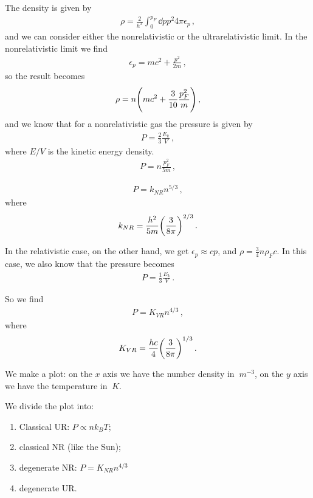 \documentclass[main.tex]{subfiles}
\begin{document}
The density is given by 
%
\begin{align}
  \rho = \frac{2}{h^3} \int_{0}^{p_F} \dd{p} p^2 4 \pi \epsilon _p
\,,
\end{align}
%
and we can consider either the nonrelativistic or the ultrarelativistic limit. In the nonrelativistic limit we find 
%
\begin{align}
  \epsilon _p = mc^2 + \frac{p^2}{2m}
\,,
\end{align}
%
so the result becomes 
%
\begin{align}
  \rho = n \qty(mc^2 + \frac{3}{10} \frac{p_F^2}{m})
\,,
\end{align}
%
and we know that for a nonrelativistic gas the pressure is given by 
%
\begin{align}
  P  = \frac{2}{3} \frac{E_k}{V}
\,,
\end{align}
%
where \(E/V\) is the kinetic energy density. 
%
\begin{align}
  P = n \frac{p_F^2}{5m}
\,,
\end{align}
%


%
\begin{align}
  P = k_{NR} n^{5/3}
\,,
\end{align}
%
where 
%
\begin{align}
  k_{NR} = \frac{h^2}{5m} \qty(\frac{3}{8 \pi })^{2/3}
\,.
\end{align}
%

In the relativistic case, on the other hand, we get \(\epsilon _p \approx cp\), and \(\rho = \frac{3}{4} n \rho _F c \). 
In this case, we also know that the pressure becomes 
%
\begin{align}
  P = \frac{1}{3} \frac{E_k}{V}
\,.
\end{align}

So we find 
%
\begin{align}
P = K_{VR} n^{4/3} 
\,,
\end{align}
%
where 
%
\begin{align}
  K_{VR} = \frac{hc}{4} \qty(\frac{3}{8 \pi })^{1/3}
\,.
\end{align}

We make a plot: on the \(x\) axis we have the number density in \(\SI{}{m^{-3}}\), on the \(y\) axis we have the temperature in \(\SI{}{K}\).

We divide the plot into: 
\begin{enumerate}
    \item Classical UR: \(P \propto n k_B T\);
    \item classical NR (like the Sun);
    \item degenerate NR: \(P = K_{NR} n^{4/3}\)
    \item degenerate UR. 
\end{enumerate}
\end{document}
